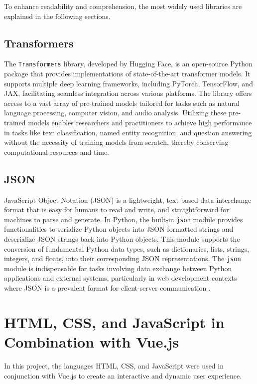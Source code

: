 To enhance readability and comprehension, the most widely used libraries are explained in the following sections.

\subsection{Transformers}

The \texttt{Transformers} library, developed by Hugging Face, is an open-source Python package that provides implementations of state-of-the-art transformer models. 
It supports multiple deep learning frameworks, including PyTorch, TensorFlow, and JAX, facilitating seamless integration across various platforms. 
The library offers access to a vast array of pre-trained models tailored for tasks such as natural language processing, computer vision, 
and audio analysis. Utilizing these pre-trained models enables researchers and practitioners to achieve high performance in tasks like text classification, 
named entity recognition, and question answering without the necessity of training models from scratch, thereby conserving computational resources and time.

\cite{transformers}

\subsection{JSON}

JavaScript Object Notation (JSON) is a lightweight, text-based data interchange format that is easy for humans to read and write, and straightforward for machines to parse and generate. In Python, the built-in \texttt{json} module provides functionalities to serialize Python objects into JSON-formatted strings and deserialize JSON strings back into Python objects. This module supports the conversion of fundamental Python data types, such as dictionaries, lists, strings, integers, and floats, into their corresponding JSON representations. The \texttt{json} module is indispensable for tasks involving data exchange between Python applications and external systems, particularly in web development contexts where JSON is a prevalent format for client-server communication 
\cite{python-json}.


\section{HTML, CSS, and JavaScript in Combination with Vue.js}

In this project, the languages HTML, CSS, and JavaScript were used in conjunction with Vue.js to create an interactive and dynamic user experience.

